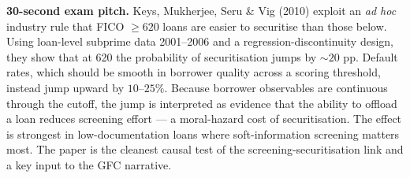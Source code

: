 \documentclass[11pt]{article}
\begin{document}
\begin{keybox}
\textbf{30-second exam pitch.} Keys, Mukherjee, Seru \& Vig (2010) exploit an \emph{ad hoc} industry rule that FICO $\geq 620$ loans are easier to securitise than those below. Using loan-level subprime data 2001--2006 and a regression-discontinuity design, they show that at 620 the probability of securitisation jumps by $\sim 20$ pp. Default rates, which should be smooth in borrower quality across a scoring threshold, instead jump upward by $10$--$25\%$. Because borrower observables are continuous through the cutoff, the jump is interpreted as evidence that the ability to offload a loan reduces screening effort --- a moral-hazard cost of securitisation. The effect is strongest in low-documentation loans where soft-information screening matters most. The paper is the cleanest causal test of the screening-securitisation link and a key input to the GFC narrative.
\end{keybox}
\end{document}
